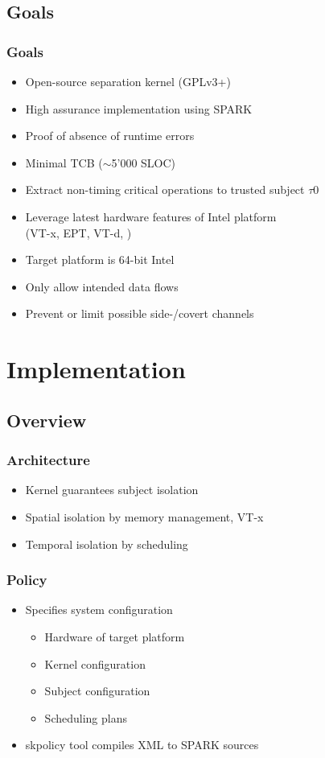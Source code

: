 \documentclass[xcolor={dvipsnames}]{beamer}
\begin{document}
\subsection{Goals}
\begin{frame}\frametitle{Goals}
\begin{itemize}
	\item Open-source separation kernel (GPLv3+)
	\item High assurance implementation using SPARK
	\item Proof of absence of runtime errors
	\item Minimal TCB ($\sim$5'000 SLOC)
	\item Extract non-timing critical operations to trusted subject $\tau$0
	\item Leverage latest hardware features of Intel platform\\(VT-x, EPT, VT-d, \textellipsis)
	\item Target platform is 64-bit Intel
	\item Only allow intended data flows
	\item Prevent or limit possible side-/covert channels
\end{itemize}
\end{frame}

\section{Implementation}
\subsection{Overview}
\begin{frame}\frametitle{Architecture}
\begin{itemize}
	\item Kernel guarantees subject isolation
	\item Spatial isolation by memory management, VT-x
	\item Temporal isolation by scheduling
\end{itemize}
\begin{center}
	
\end{center}
\end{frame}

\begin{frame}\frametitle{Policy}
\begin{itemize}
	\item Specifies system configuration
	\begin{itemize}
		\item Hardware of target platform
		\item Kernel configuration
		\item Subject configuration
		\item Scheduling plans
	\end{itemize}
	\item skpolicy tool compiles XML to SPARK sources
\end{itemize}

\end{frame}
\end{document}
